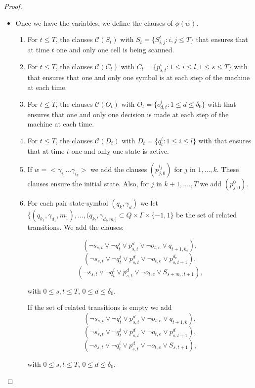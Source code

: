 \begin{proof}
\begin{itemize}
  \item Once we have the variables, we define the clauses of $\phi(w)$.
    \begin{enumerate}
    \item For $t\le T$, the clauses $\mathcal{C}(S_t)$ with $S_t = \{S_{i,j}^t : i,j \le T\}$  that ensures that at time $t$ one and only one cell is being scanned.
    \item  For $t\le T$, the clauses $\mathcal{C}(C_{t})$ with $C_t = \{p_{s,t}^{i} : 1\le i \le l, 1 \le s \le T\}$ with  that ensures that one and only one symbol is at each step of the machine at each time.
    \item  For $t\le T$, the clauses $\mathcal{C}(O_{t})$ with $O_t = \{o_{d,t}^{i} : 1\le d \le \delta_0\}$ with  that ensures that one and only one decision is made at each step of the machine at each time.
    \item For $t\le T$, the clauses $\mathcal{C}(D_{t})$ with $D_t = \{q_t^{i} : 1\le i \le l\}$ with  that ensures that at time $t$ one and only one state is active.
    \item If $w = <\gamma_{i_1}...\gamma_{i_k}>$ we add the clauses $(p_{j,0}^{i_j})$ for $j$ in $1,...,k$. These clauses ensure the initial state. Also, for $j$ in $k+1,....,T$ we add $(p_{j,0}^0)$.  
    \item For each pair state-symbol $(q_k,\gamma_d)$ we let $\{(q_{k_1} , \gamma_{d_1} , m_1 ), ... , (q_{k_l} , \gamma_{d_l , m_l)} \subset Q \times \Gamma \times \{-1,1\}$ be the set of related transitions. We add the clauses:

    \[
    (\neg s_{s,t} \lor \neg q_t^i  \lor p_{s,t}^d \lor \neg o_{t, e}  \lor q_{t+1, k_e}),
    \]
    \[
(      \neg s_{s,t} \lor \neg q_t^i  \lor p_{s,t}^d \lor \neg o_{t, e}  \lor p_{s,t+1}^{d_e}),
    \]
    \[
(      \neg s_{s,t} \lor \neg q_t^i  \lor p_{s,t}^d \lor \neg o_{t, e}  \lor S_{s+m_e, t+1}),
    \]

    with $0 \le s,t \le T$, $0 \le d \le  \delta_0$. 

    If the set of related transitions is empty we add
    \[
    (\neg s_{s,t} \lor \neg q_t^i  \lor p_{s,t}^d \lor \neg o_{t, e}  \lor q_{t+1, k}),
    \]
    \[
(      \neg s_{s,t} \lor \neg q_t^i  \lor p_{s,t}^d \lor \neg o_{t, e}  \lor p_{s,t+1}^{d}),
    \]
    \[
(      \neg s_{s,t} \lor \neg q_t^i  \lor p_{s,t}^d \lor \neg o_{t, e}  \lor S_{s, t+1}),
    \]

    with $0 \le s,t \le T$, $0 \le d \le  \delta_0$.
    

\end{enumerate}
\end{itemize}
\end{proof}

